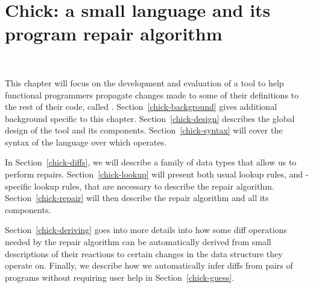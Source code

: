 \chapter{Chick: a small language and its program repair algorithm}~\label{chick}

This chapter will focus on the development and evaluation of a tool to help
functional programmers propagate changes made to some of their definitions to
the rest of their code, called \Chick{}\footnotemark{}.
Section~\ref{chick-background} gives additional background specific to this
chapter.  Section~\ref{chick-design} describes the global design of the tool and
its components.  Section~\ref{chick-syntax} will cover the syntax of the
language over which \Chick{} operates.


In Section~\ref{chick-diffs}, we will describe a family of data types that allow
us to perform repairs.  Section~\ref{chick-lookup} will present both usual
lookup rules, and \Chick{}-specific lookup rules, that are necessary to describe
the repair algorithm.  Section~\ref{chick-repair} will then describe the repair
algorithm and all its components.

Section~\ref{chick-deriving} goes into more details into how some diff
operations needed by the repair algorithm can be automatically derived from
small descriptions of their reactions to certain changes in the data structure
they operate on.  Finally, we describe how we automatically infer diffs from
pairs of programs without requiring user help in Section~\ref{chick-guess}.









